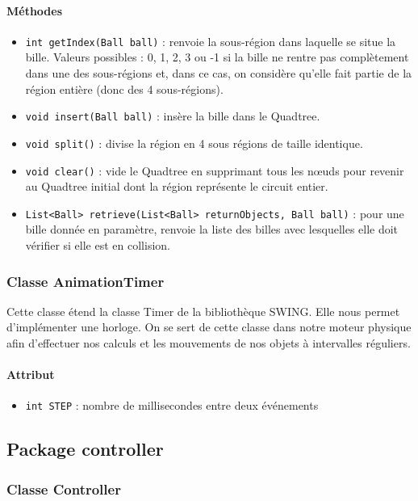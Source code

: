 \documentclass{report}
\begin{document}
\paragraph*{Méthodes}
\begin{itemize}
\item \texttt{int getIndex(Ball ball)} : renvoie la sous-région dans laquelle se situe la bille. Valeurs possibles : 0, 1, 2, 3 ou -1 si la bille ne rentre pas complètement dans une des sous-régions et, dans ce cas, on considère qu'elle fait partie de la région entière (donc des 4 sous-régions).
\item \texttt{void insert(Ball ball)} : insère la bille dans le Quadtree.
\item \texttt{void split()} : divise la région en 4 sous régions de taille identique.
\item \texttt{void clear()} : vide le Quadtree en supprimant tous les nœuds pour revenir au Quadtree initial dont la région représente le circuit entier.
\item \texttt{List<Ball> retrieve(List<Ball> returnObjects, Ball ball)} : pour une bille donnée en paramètre, renvoie la liste des billes avec lesquelles elle doit vérifier si elle est en collision.
\end{itemize}

\subsubsection{Classe AnimationTimer}

Cette classe étend la classe Timer de la bibliothèque SWING. Elle nous permet d'implémenter une horloge. On se sert de cette classe dans notre moteur physique afin d'effectuer nos calculs et les mouvements de nos objets à intervalles réguliers.

\paragraph*{Attribut}
\begin{itemize}
\item \texttt{int STEP} : nombre de millisecondes entre deux événements
\end{itemize}

\subsection{Package controller}

\subsubsection{Classe Controller}
\end{document}
